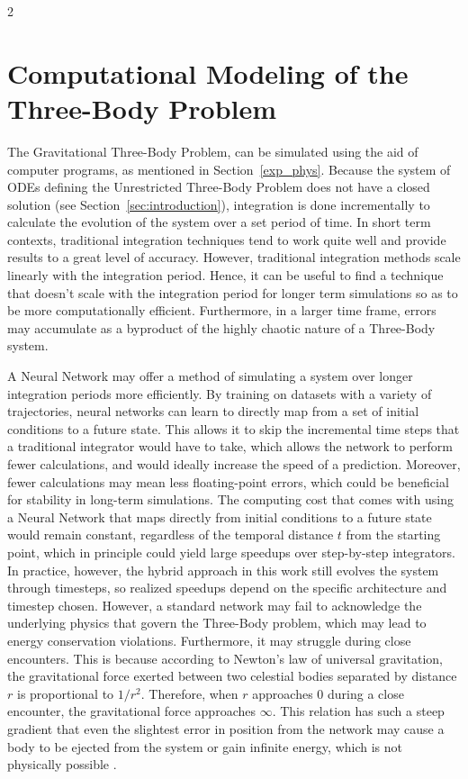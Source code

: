 \documentclass{article}
\begin{document}
\begin{multicols}{2}
\section{Computational Modeling of the Three-Body Problem}
\label{sec:comp_modeling}
The Gravitational Three-Body Problem, can be simulated using the aid of computer programs, as mentioned in Section~\ref{exp_phys}. Because the system of ODEs defining the Unrestricted Three-Body Problem does not have a closed solution (see Section~\ref{sec:introduction}), integration is done incrementally to calculate the evolution of the system over a set period of time. In short term contexts, traditional integration techniques tend to work quite well and provide results to a great level of accuracy. However, traditional integration methods scale linearly with the integration period. Hence, it can be useful to find a technique that doesn't scale with the integration period for longer term simulations so as to be more computationally efficient. Furthermore, in a larger time frame, errors may accumulate as a byproduct of the highly chaotic nature of a Three-Body system. 

A Neural Network may offer a method of simulating a system over longer integration periods more efficiently. By training on datasets with a variety of trajectories, neural networks can learn to directly map from a set of initial conditions to a future state. This allows it to skip the incremental time steps that a traditional integrator would have to take, which allows the network to perform fewer calculations, and would ideally increase the speed of a prediction. Moreover, fewer calculations may mean less floating-point errors, which could be beneficial for stability in long-term simulations. The computing cost that comes with using a Neural Network that maps directly from initial conditions to a future state would remain constant, regardless of the temporal distance $t$ from the starting point, which in principle could yield large speedups over step-by-step integrators. In practice, however, the hybrid approach in this work still evolves the system through timesteps, so realized speedups depend on the specific architecture and timestep chosen. However, a standard network may fail to acknowledge the underlying physics that govern the Three-Body problem, which may lead to energy conservation violations. Furthermore, it may struggle during close encounters. This is because according to Newton's law of universal gravitation, the gravitational force exerted between two celestial bodies separated by distance $r$ is proportional to $1/r^2$. Therefore, when $r$ approaches $0$ during a close encounter, the gravitational force approaches $\infty$. This relation has such a steep gradient that even the slightest error in position from the network may cause a body to be ejected from the system or gain infinite energy, which is not physically possible \cite{Dehnen2001}.


\end{multicols}
\end{document}
